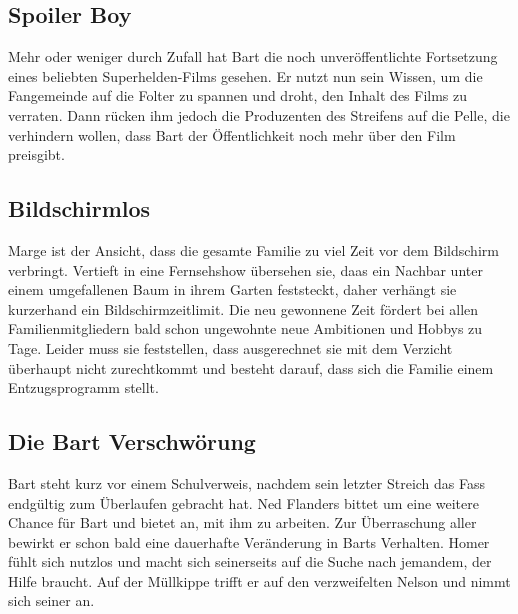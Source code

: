 \subsection{Spoiler Boy}
Mehr oder weniger durch Zufall hat Bart die noch unveröffentlichte Fortsetzung eines beliebten Superhelden-Films gesehen. Er nutzt nun sein Wissen, um die Fangemeinde auf die Folter zu spannen und droht, den Inhalt des Films zu verraten. Dann rücken ihm jedoch die Produzenten des Streifens auf die Pelle, die verhindern wollen, dass Bart der Öffentlichkeit noch mehr über den Film preisgibt.


\subsection{Bildschirmlos}\label{ZABF09}
Marge ist der Ansicht, dass die gesamte Familie zu viel Zeit vor dem Bildschirm verbringt. Vertieft in eine Fernsehshow übersehen sie, daas ein Nachbar unter einem umgefallenen Baum in ihrem Garten feststeckt, daher verhängt sie kurzerhand ein Bildschirmzeitlimit. Die neu gewonnene Zeit fördert bei allen Familienmitgliedern bald schon ungewohnte neue Ambitionen und Hobbys zu Tage. Leider muss sie feststellen, dass ausgerechnet sie mit dem Verzicht überhaupt nicht zurechtkommt und besteht darauf, dass sich die Familie einem Entzugsprogramm stellt.


\subsection{Die Bart Verschwörung}
Bart steht kurz vor einem Schulverweis, nachdem sein letzter Streich das Fass endgültig zum Überlaufen gebracht hat. Ned Flanders bittet um eine weitere Chance für Bart und bietet an, mit ihm zu arbeiten. Zur Überraschung aller bewirkt er schon bald eine dauerhafte Veränderung in Barts Verhalten. Homer fühlt sich nutzlos und macht sich seinerseits auf die Suche nach jemandem, der Hilfe braucht. Auf der Müllkippe trifft er auf den verzweifelten Nelson und nimmt sich seiner an.

